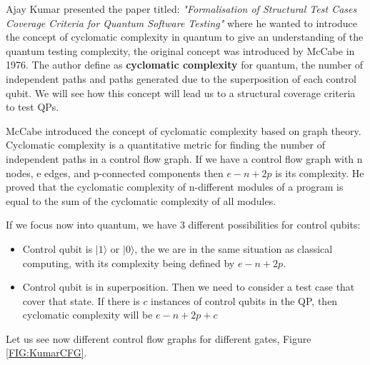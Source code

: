 \begin{itemize}
Ajay Kumar presented the paper titled: \textit{"Formalisation of Structural Test Cases Coverage Criteria for Quantum Software Testing"} \cite{kumar2023formalization} where he wanted to introduce the concept of cyclomatic complexity in quantum to give an understanding of the quantum testing complexity, the original concept was introduced by McCabe in 1976\cite{mccabe1976complexity}. The author define as \textbf{cyclomatic complexity} for quantum, the number of independent paths and paths generated due to the superposition of each control qubit. We will see how this concept will lead us to a structural coverage criteria to test QPs.\newline

McCabe\cite{mccabe1976complexity} introduced the concept of cyclomatic complexity based on graph theory. Cyclomatic complexity is a quantitative metric for finding the number of independent paths in a control flow graph. If we have a control flow graph with n nodes, e edges, and p-connected components then $e-n+2p$ is its complexity. He proved that the cyclomatic complexity of n-different modules of a program is equal to the sum of the cyclomatic complexity of all modules.\newline

If we focus now into quantum, we have 3 different possibilities for control qubits:

\begin{itemize}
    \item Control qubit is $|1\rangle$ or $|0\rangle$, the we are in the same situation as classical computing, with its complexity being defined by $e-n+2p$.
    \item Control qubit is in superposition. Then we need to consider a test case that cover that state. If there is $c$ instances of control qubits in the QP, then cyclomatic complexity will be $e-n+2p+c$
\end{itemize}

Let us see now different control flow graphs for different gates, Figure \ref{FIG:KumarCFG}.


\end{itemize}
